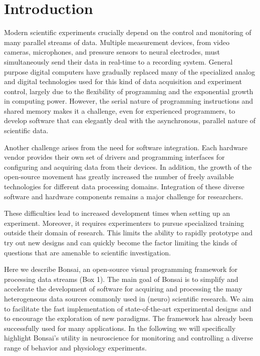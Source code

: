 				
\section{Introduction}

Modern scientific experiments crucially depend on the control and monitoring of many parallel streams of data. Multiple measurement devices, from video cameras, microphones, and pressure sensors to neural electrodes, must simultaneously send their data in real-time to a recording system. General purpose digital computers have gradually replaced many of the specialized analog and digital technologies used for this kind of data acquisition and experiment control, largely due to the flexibility of programming and the exponential growth in computing power. However, the serial nature of programming instructions and shared memory makes it a challenge, even for experienced programmers, to develop software that can elegantly deal with the asynchronous, parallel nature of scientific data.

Another challenge arises from the need for software integration. Each hardware vendor provides their own set of drivers and programming interfaces for configuring and acquiring data from their devices. In addition, the growth of the open-source movement has greatly increased the number of freely available technologies for different data processing domains. Integration of these diverse software and hardware components remains a major challenge for researchers.

These difficulties lead to increased development times when setting up an experiment. Moreover, it requires experimenters to pursue specialized training outside their domain of research. This limits the ability to rapidly prototype and try out new designs and can quickly become the factor limiting the kinds of questions that are amenable to scientific investigation.

Here we describe Bonsai, an open-source visual programming framework for processing data streams (Box 1). The main goal of Bonsai is to simplify and accelerate the development of software for acquiring and processing the many heterogeneous data sources commonly used in (neuro) scientific research. We aim to facilitate the fast implementation of state-of-the-art experimental designs and to encourage the exploration of new paradigms. The framework has already been successfully used for many applications. In the following we will specifically highlight Bonsai's utility in neuroscience for monitoring and controlling a diverse range of behavior and physiology experiments.

